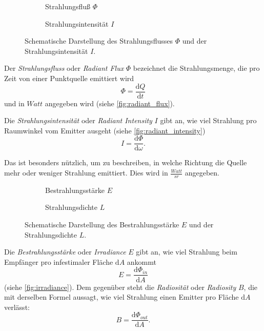 \documentclass[thesis.tex]{subfiles}
\begin{document}
\begin{figure}[ht!]
\centering
\begin{subfigure}[b]{0.45\textwidth}
\centering
{}
\caption{Strahlungsfluß $\Phi$}
\label{fig:radiant_flux}
\end{subfigure}
\begin{subfigure}[b]{0.45\textwidth}
\centering
{}
\caption{Strahlungsintensität $I$}
\label{fig:radiant_intensity}
\end{subfigure}
\caption{Schematische Darstellung des Strahlungsflusses $\Phi$ und der Strahlungsintensität $I$.}
\end{figure}

Der \emph{Strahlungsfluss} oder \emph{Radiant Flux} $\Phi$  bezeichnet die Strahlungsmenge, die pro Zeit von einer Punktquelle emittiert wird 
\begin{equation}
\Phi = \frac{\mathrm{d}Q}{\mathrm{d}t}
\end{equation}
und in $Watt$ angegeben wird (siehe \autoref{fig:radiant_flux}). 

Die \emph{Strahlungsintensität} oder \emph{Radiant Intensity} $I$ gibt an, wie viel Strahlung pro Raumwinkel vom Emitter ausgeht (siehe \autoref{fig:radiant_intensity}) 
\begin{equation}
I = \frac{\mathrm{d}\Phi}{\mathrm{d}\omega}.
\end{equation}

Das ist besonders nützlich, um zu beschreiben, in welche Richtung die Quelle mehr oder weniger Strahlung emittiert. Dies wird in $\frac{Watt}{sr}$ angegeben.

\begin{figure}[ht!]
\centering
\begin{subfigure}[b]{0.45\textwidth}
\centering
{}
\caption{Bestrahlungsstärke $E$}
\label{fig:irradiance}
\end{subfigure}
\begin{subfigure}[b]{0.45\textwidth}
\centering
{}
\caption{Strahlungsdichte $L$}
\label{fig:radiance}
\end{subfigure}
\caption{Schematische Darstellung des Bestrahlungsstärke $E$ und der Strahlungsdichte $L$.}
\end{figure}

Die \emph{Bestrahlungsstärke} oder \emph{Irradiance} $E$ gibt an, wie viel Strahlung beim Empfänger pro infestimaler Fläche $\mathrm{d}A$ ankommt
\begin{equation}
E = \frac{\mathrm{d}\Phi_{in}}{\mathrm{d}A}
\end{equation}
(siehe \autoref{fig:irradiance}). Dem gegenüber steht die \emph{Radiosität} oder \emph{Radiosity} $B$, die mit derselben Formel aussagt, wie viel Strahlung einen Emitter pro Fläche $\mathrm{d}A$ verlässt: 
\begin{equation}
B = \frac{\mathrm{d}\Phi_{out}}{\mathrm{d}A}.
\end{equation}
\end{document}
